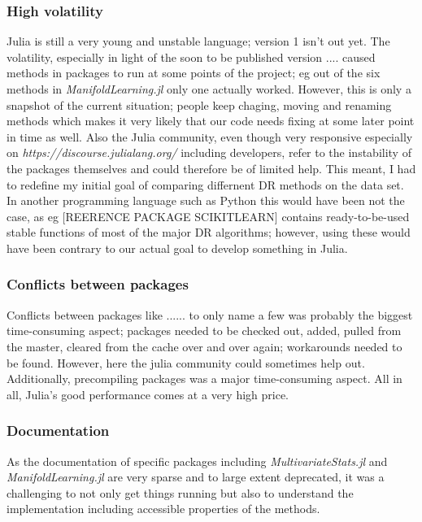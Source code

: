 \documentclass[journal, a4paper]{IEEEtran}
\begin{document}
\subsubsection{High volatility}
Julia is still a very young and unstable language; version 1 isn't out yet. The volatility, especially in light of the soon to be published version ....
caused methods in packages to run at some points of the project; eg out of the six methods in \textit{ManifoldLearning.jl} only one actually worked. However, this is only a snapshot of the current situation; people keep chaging, moving and renaming methods which makes it very likely that our code needs fixing at some later point in time as well. 
Also the Julia community, even though very responsive especially on \textit{https://discourse.julialang.org/} including developers, refer to the instability of the packages themselves and could therefore be of limited help. %
This meant, I had to redefine my initial goal of comparing differnent DR methods on the data set.
In another programming language such as Python this would have been not the case, as eg [REERENCE PACKAGE SCIKITLEARN] contains ready-to-be-used stable functions of most of the major DR algorithms; however, using these would have been contrary to our actual goal to develop something in Julia.

\subsubsection{Conflicts between packages}
Conflicts between packages like ...... to only name a few was probably the biggest time-consuming aspect; packages needed to be checked out, added, pulled from the master, cleared from the cache over and over again; workarounds needed to be found. 
However, here the julia community could sometimes help out.
Additionally, precompiling packages was a major time-consuming aspect. All in all, Julia's good performance comes at a very high price.

\subsubsection{Documentation}
As the documentation of specific packages including \textit{MultivariateStats.jl} and \textit{ManifoldLearning.jl} are very sparse and to large extent deprecated, it was a challenging to not only get things running but also to understand the implementation including accessible properties of the methods.\\
\end{document}
